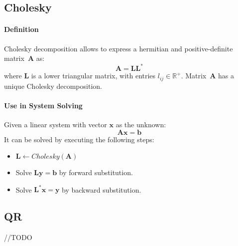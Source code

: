 \subsection{Cholesky}
\paragraph{Definition}
Cholesky decomposition allows to express a hermitian and positive-definite matrix~$\mathbf{A}$ as:
\begin{equation}
 \mathbf{A} = \mathbf{L}\mathbf{L}^*
\end{equation}
where $\mathbf{L}$ is a lower triangular matrix, with entries $l_{ij}\in \mathbb{R}^+$. Matrix~$\mathbf{A}$ has a unique Cholesky decomposition.

\paragraph{Use in System Solving}
Given a linear system with vector $\mathbf{x}$ as the unknown:
\begin{equation}
 \mathbf{A}\mathbf{x} = \mathbf{b}
\end{equation}
It can be solved by executing the following steps: 
\begin{itemize}
 \item $\mathbf{L} \leftarrow Cholesky(\mathbf{A})$
 \item Solve $\mathbf{L}\mathbf{y}=\mathbf{b}$ by forward substitution.
 \item Solve $\mathbf{L}^*\mathbf{x}=\mathbf{y}$ by backward substitution.
\end{itemize}


\subsection{QR}
//TODO
